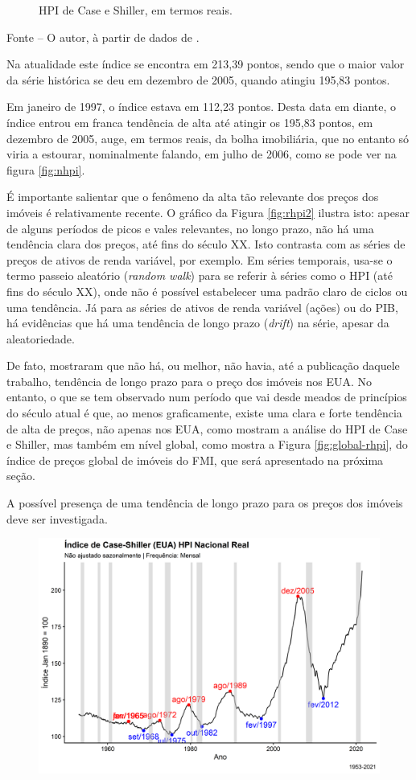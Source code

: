 \documentclass[
	12pt,				%
	oneside,			%
	a4paper,			%
	chapter=TITLE,		%
	section=TITLE,		%
	english,			%
	brazil				%
	]{abntex2}
\newcommand{\bcenter}{\begin{center}}
\newcommand{\ecenter}{\end{center}}
\begin{document}
\begin{refsection}
\begin{figure}[H]
{}

\caption{\gls{HPI} de Case e Shiller, em termos reais.}\label{fig:rhpi1}
\end{figure}
\bcenter

\small Fonte -- O autor, à partir de dados de \textcite{QuandlWIKI}.
\ecenter

Na atualidade este índice se encontra em 213,39 pontos, sendo
que o maior valor da série histórica se deu em dezembro de 2005, quando atingiu
195,83 pontos.

Em janeiro de 1997, o índice estava em 112,23 pontos.
Desta data em diante, o índice entrou em franca tendência de alta até atingir os
195,83 pontos, em dezembro de 2005, auge, em termos
reais, da bolha imobiliária, que no entanto só viria a estourar, nominalmente
falando, em julho de 2006, como se pode ver na figura \ref{fig:nhpi}.

É importante salientar que o fenômeno da alta tão relevante dos preços dos
imóveis é relativamente recente. O gráfico da Figura \ref{fig:rhpi2} ilustra
isto: apesar de alguns períodos de picos e vales relevantes, no longo prazo, não
há uma tendência clara dos preços, até fins do século XX. Isto contrasta com as
séries de preços de ativos de renda variável, por exemplo. Em séries temporais,
usa-se o termo passeio aleatório (\emph{random walk}) para se referir à séries como o
HPI (até fins do século XX), onde não é possível estabelecer uma padrão claro de
ciclos ou uma tendência. Já para as séries de ativos de renda variável (ações)
ou do \gls{PIB}, há evidências que há uma tendência de longo prazo (\emph{drift}) na
série, apesar da aleatoriedade.

De fato, \textcite[p.~290-291]{supplyelasticity} mostraram que não há, ou melhor, não
havia, até a publicação daquele trabalho, tendência de longo prazo para o preço
dos imóveis nos \gls{EUA}. No entanto, o que se tem observado num período que
vai desde meados de princípios do século atual é que, ao menos graficamente,
existe uma clara e forte tendência de alta de preços, não apenas nos \gls{EUA},
como mostram a análise do HPI de Case e Shiller, mas também em nível global,
como mostra a Figura \ref{fig:global-rhpi}, do índice de preços global de
imóveis do \gls{FMI}, que será apresentado na próxima seção.

A possível presença de uma tendência de longo prazo para os preços dos imóveis
deve ser investigada.
\begin{figure}[H]

{\centering \includegraphics[width=0.7\linewidth]{images/rhpi2-1} 

}
\end{figure}
\end{refsection}
\end{document}

